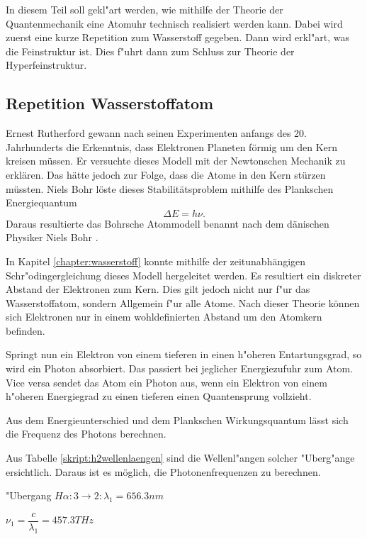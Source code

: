 \begin{refsection}
In diesem Teil soll gekl"art werden, wie mithilfe der Theorie der Quantenmechanik eine Atomuhr technisch realisiert werden kann. Dabei wird zuerst eine kurze Repetition zum Wasserstoff gegeben. Dann wird erkl"art, was die Feinstruktur ist. Dies f"uhrt dann zum Schluss zur Theorie der Hyperfeinstruktur.

\subsection{Repetition Wasserstoffatom}
Ernest Rutherford gewann nach seinen Experimenten anfangs des 20. Jahrhunderts die Erkenntnis, dass Elektronen Planeten förmig um den Kern kreisen müssen. 
Er versuchte dieses Modell mit der Newtonschen Mechanik zu erklären. 
Das hätte jedoch zur Folge, dass die Atome in den Kern stürzen müssten. 
Niels Bohr löste dieses Stabilitätsproblem mithilfe des Plankschen Energiequantum 
\begin{equation}
\varDelta E = h\nu.
\end{equation}
Daraus resultierte das Bohrsche Atommodell benannt nach dem dänischen Physiker Niels Bohr \cite{wiki:bohr}. 

In Kapitel \ref{chapter:wasserstoff} konnte mithilfe der zeitunabhängigen Schr"odingergleichung dieses Modell hergeleitet werden.
Es resultiert ein diskreter Abstand der Elektronen zum Kern.
Dies gilt jedoch nicht nur f"ur das Wasserstoffatom, sondern Allgemein f"ur alle Atome.
Nach dieser Theorie können sich Elektronen nur in einem wohldefinierten Abstand um den Atomkern befinden. 

Springt nun ein Elektron von einem tieferen in einen h"oheren Entartungsgrad, so wird ein Photon absorbiert.
Das passiert bei jeglicher Energiezufuhr zum Atom. 
Vice versa sendet das Atom ein Photon aus, wenn ein Elektron von einem h"oheren Energiegrad zu einen tieferen einen Quantensprung vollzieht.

Aus dem Energieunterschied und dem Plankschen Wirkungsquantum lässt sich die Frequenz des Photons berechnen. %

Aus Tabelle \ref{skript:h2wellenlaengen} sind die Wellenl"angen solcher "Uberg"ange ersichtlich. Daraus ist es möglich, die Photonenfrequenzen zu berechnen.
\begin{center}
	"Ubergang $H\alpha: 3 \rightarrow 2: \lambda_1 = 656.3nm$

$\nu_1 = \dfrac{c}{\lambda_1} = 457.3 THz $
\vspace{.5cm}


\end{center}
\end{refsection}
